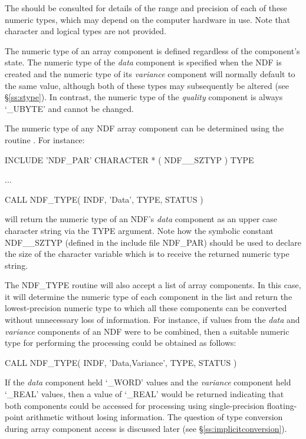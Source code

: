 \documentclass[twoside,11pt,nolof]{starlink}
\providecommand{\st}[1]{{\emph{#1}}}
\begin{document}
The 
 should be consulted for details of the range and
precision of each of these numeric types, which may depend on the
computer hardware in use.
Note that character and logical types are not provided.

The numeric type of an array component is defined regardless of the
component's state.
The numeric type of the \st{data\/} component is specified when the NDF is
created and the numeric type of its \st{variance\/} component will normally
default to the same value, although both of these types may subsequently be
altered (see \S\ref{ss:stype}).
In contrast, the numeric type of the \st{quality\/} component is
always `\_UBYTE' and cannot be changed.

The numeric type of any NDF array component can be determined using the
routine .
For instance:

\small
\begin{terminalv}
      INCLUDE 'NDF_PAR'
      CHARACTER * ( NDF__SZTYP ) TYPE

      ...

      CALL NDF_TYPE( INDF, 'Data', TYPE, STATUS )
\end{terminalv}
\normalsize

will return the numeric type of an NDF's \st{data\/} component as an upper
case character string via the TYPE argument.
Note how the symbolic constant NDF\_\_SZTYP (defined in the include file
NDF\_PAR) should be used to declare the size of the character variable which
is to receive the returned numeric type string.

The NDF\_TYPE routine will also accept a list of array components.
In this case, it will determine the numeric type of each component in the
list and return the lowest-precision numeric type to which all these
components can be converted without unnecessary loss of information.
For instance, if values from the \st{data\/} and \st{variance\/} components of
an NDF were to be combined, then a suitable numeric type for performing the
processing could be obtained as follows:

\small
\begin{terminalv}
      CALL NDF_TYPE( INDF, 'Data,Variance', TYPE, STATUS )
\end{terminalv}
\normalsize

If the \st{data\/} component held `\_WORD' values and the \st{variance\/}
component held `\_REAL' values, then a value of `\_REAL' would be returned
indicating that both components could be accessed for processing using
single-precision floating-point arithmetic without losing information.
The question of type conversion during array component access is discussed
later (see \S\ref{ss:implicitconversion}).
\end{document}
